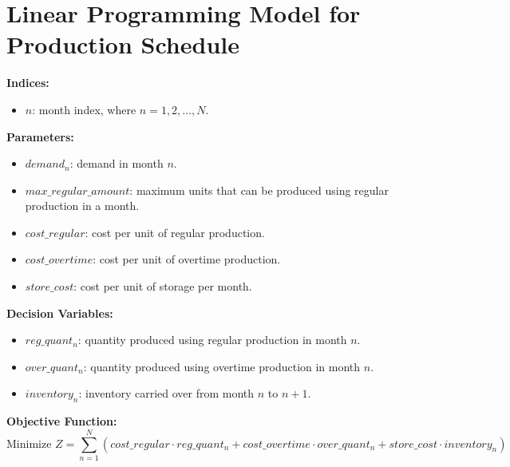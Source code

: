 \documentclass{article}
\begin{document}
\section*{Linear Programming Model for Production Schedule}

\textbf{Indices:}
\begin{itemize}
    \item $n$: month index, where $n = 1, 2, \ldots, N$.
\end{itemize}

\textbf{Parameters:}
\begin{itemize}
    \item $demand_{n}$: demand in month $n$.
    \item $max\_regular\_amount$: maximum units that can be produced using regular production in a month.
    \item $cost\_regular$: cost per unit of regular production.
    \item $cost\_overtime$: cost per unit of overtime production.
    \item $store\_cost$: cost per unit of storage per month.
\end{itemize}

\textbf{Decision Variables:}
\begin{itemize}
    \item $reg\_quant_{n}$: quantity produced using regular production in month $n$.
    \item $over\_quant_{n}$: quantity produced using overtime production in month $n$.
    \item $inventory_{n}$: inventory carried over from month $n$ to $n+1$.
\end{itemize}

\textbf{Objective Function:}
\begin{equation}
\text{Minimize } Z = \sum_{n=1}^{N} \left( cost\_regular \cdot reg\_quant_{n} + cost\_overtime \cdot over\_quant_{n} + store\_cost \cdot inventory_{n} \right)
\end{equation}
\end{document}
